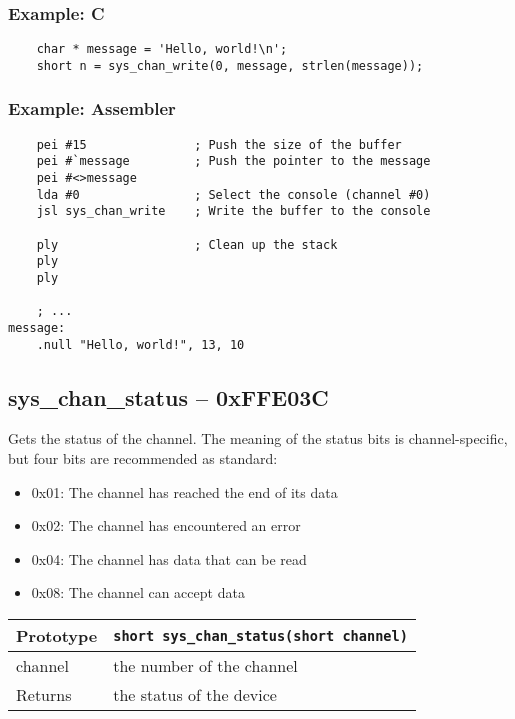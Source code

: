 \subsubsection*{Example: C}
\begin{lstlisting}
    char * message = 'Hello, world!\n';
    short n = sys_chan_write(0, message, strlen(message));
\end{lstlisting}

\subsubsection*{Example: Assembler}
\begin{verbatim}
    pei #15               ; Push the size of the buffer
    pei #`message         ; Push the pointer to the message
    pei #<>message
    lda #0                ; Select the console (channel #0)
    jsl sys_chan_write    ; Write the buffer to the console

    ply                   ; Clean up the stack
    ply
    ply
    
    ; ...
message:
    .null "Hello, world!", 13, 10
\end{verbatim}

\subsection*{sys\_chan\_status -- 0xFFE03C}
Gets the status of the channel. The meaning of the status bits is channel-specific, but four bits are recommended as standard:

\begin{itemize}
\item 0x01: The channel has reached the end of its data
\item 0x02: The channel has encountered an error
\item 0x04: The channel has data that can be read
\item 0x08: The channel can accept data
\end{itemize}

\bigskip

\begin{tabular}{|l||l|} \hline
Prototype & \lstinline!short sys_chan_status(short channel)! \\ \hline
channel & the number of the channel \\ \hline
Returns & the status of the device \\ \hline
\end{tabular}

